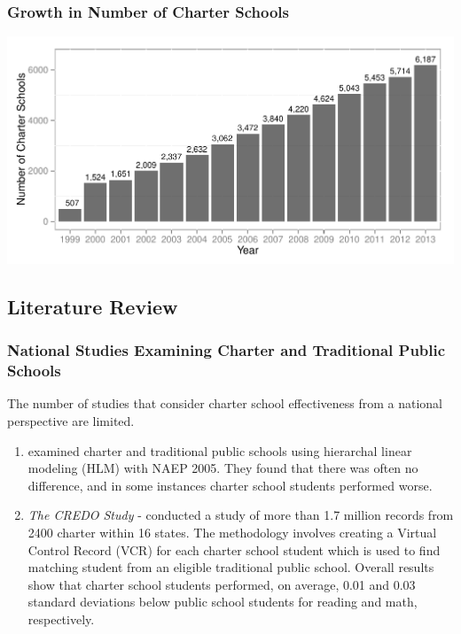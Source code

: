 \documentclass[10pt,handout,mathserif]{beamer}
\begin{document}
\begin{frame}[c]
	\frametitle{Growth in Number of Charter Schools}
	\includegraphics[width=\textwidth,keepaspectratio=true]{../Figures/CharterSchoolGrowth.pdf}
\end{frame}

\subsection{Literature Review}

\begin{frame}[c]
	\frametitle{National Studies Examining Charter and Traditional Public Schools}
	The number of studies that consider charter school effectiveness from a national perspective are limited.
	\ \\
	\begin{enumerate}
	    \setlength{\itemsep}{10pt}
		\item {} examined charter and traditional public schools using hierarchal linear modeling (HLM) with NAEP 2005. They found that there was often no difference, and in some instances charter school students performed worse.
		\pause
		\item \textit{The CREDO Study} -  conducted a study of more than 1.7 million records from 2400 charter within 16 states. The methodology involves creating a Virtual Control Record (VCR) for each charter school student which is used to find matching student from an eligible traditional public school.
		Overall results show that charter school students performed, on average, 0.01 and 0.03 standard deviations below public school students for reading and math, respectively.
	\end{enumerate}
\end{frame}

\end{document}
